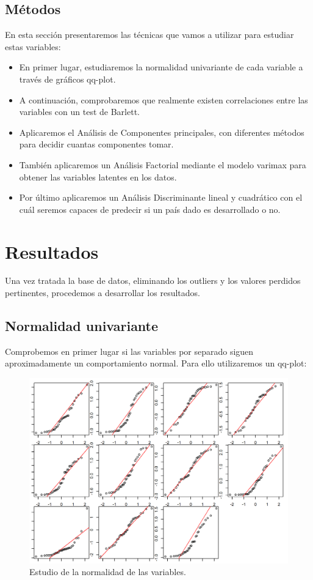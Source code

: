 \subsection{Métodos}
En esta sección presentaremos las técnicas que vamos a utilizar para estudiar estas variables:
\begin{itemize}
\item En primer lugar, estudiaremos la normalidad univariante de cada variable a través de gráficos qq-plot.
\item A continuación, comprobaremos que realmente existen correlaciones entre las variables con un test de Barlett.
\item Aplicaremos el Análisis de Componentes principales, con diferentes métodos para decidir cuantas componentes tomar.
\item También aplicaremos un Análisis Factorial mediante el modelo varimax para obtener las variables latentes en los datos.
\item Por último aplicaremos un Análisis Discriminante lineal y cuadrático con el cuál seremos capaces de predecir si un país dado es desarrollado o no.

\end{itemize}

\section{Resultados}
Una vez tratada la base de datos, eliminando los outliers y los valores perdidos pertinentes, procedemos a desarrollar los resultados.
\subsection{Normalidad univariante}
Comprobemos en primer lugar si las variables por separado siguen aproximadamente un comportamiento normal. Para ello utilizaremos un qq-plot:

\begin{figure}[H]
    \centering
    \includegraphics[scale=1]{qq-plot.png}
    \caption{Estudio de la normalidad de las variables.}
\end{figure}

